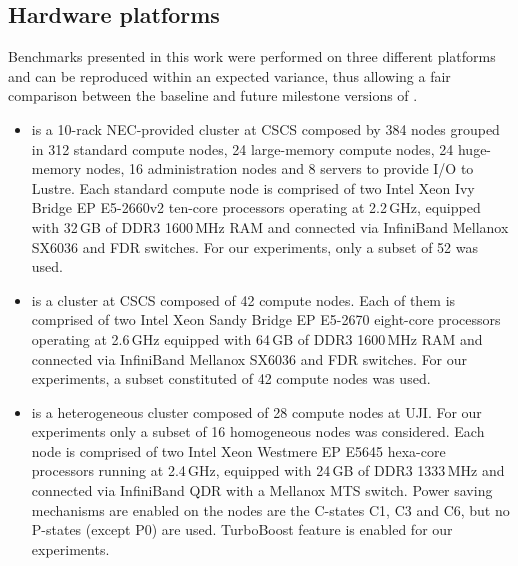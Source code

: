 \subsection{Hardware platforms}
\label{subsec:3.1}

Benchmarks presented  in this work  were performed on  three different
platforms  and can  be reproduced  within an  expected  variance, thus
allowing a  fair comparison between the baseline  and future milestone
versions of \cosmoart.

\begin{itemize}
\item \monch is  a 10-rack NEC-provided clus\-ter at  CSCS composed by
  384   nodes  grouped  in  312  standard  compute  nodes,  24
  large-memory compute nodes,  24 huge-memory nodes, 16 administration
  nodes and 8 servers to provide I/O to Lustre.
Each standard  compute node  is comprised of  two Intel Xeon Ivy Bridge EP
E5-2660v2  ten-core processors  operating at  2.2\,GHz,  equipped with
32\,GB  of DDR3 1600\,MHz  RAM and  connected via  InfiniBand Mellanox
SX6036 and FDR switches.  For our experiments, only a subset of 52 was used. %

\item \pilat is a cluster at CSCS composed of 42 compute nodes.  
  Each of them is comprised of two Intel Xeon Sandy Bridge EP E5-2670 eight-core processors operating
  at 2.6\,GHz equipped with 64\,GB of DDR3 1600\,MHz RAM and connected
  via  InfiniBand   Mellanox  SX6036   and  FDR  switches.    For  our
  experiments, a subset constituted of 42 compute  nodes was used.

\item \tinto is  a heterogeneous cluster composed of  28 compute nodes
  at UJI.  For our experiments only  a subset of  16 homogeneous nodes
  was  considered. Each  node  is  comprised of  two  Intel Xeon Westmere EP E5645
  hexa-core processors  running at  2.4\,GHz, equipped with  24\,GB of
  DDR3  1333\,MHz and  connected via  InfiniBand QDR  with  a Mellanox
  MTS switch. Power saving mechanisms are enabled on the nodes are the C-states C1, C3 and C6, 
  but no P-states (except P0) are used. TurboBoost feature is enabled for our experiments.
\end{itemize}

